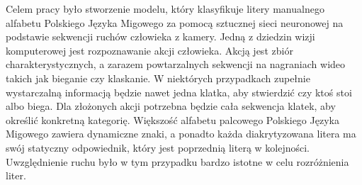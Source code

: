 Celem pracy było stworzenie modelu, który klasyfikuje litery manualnego alfabetu Polskiego Języka Migowego za pomocą sztucznej sieci neuronowej na podstawie sekwencji ruchów człowieka z kamery. Jedną z dziedzin wizji komputerowej jest rozpoznawanie akcji człowieka. Akcją jest zbiór charakterystycznych, a zarazem powtarzalnych sekwencji na nagraniach wideo takich jak bieganie czy klaskanie. W niektórych przypadkach zupełnie wystarczalną informacją będzie nawet jedna klatka, aby stwierdzić czy ktoś stoi albo biega. Dla złożonych akcji potrzebna będzie cała sekwencja klatek, aby określić konkretną kategorię. Większość alfabetu palcowego Polskiego Języka Migowego zawiera dynamiczne znaki, a ponadto każda diakrytyzowana litera ma swój statyczny odpowiednik, który jest poprzednią literą w kolejności. Uwzględnienie ruchu było w tym przypadku bardzo istotne w celu rozróżnienia liter.
